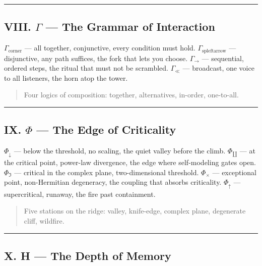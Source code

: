 \documentclass[12pt,a4paper]{article}
\begin{document}
\begin{center}
\rule{0.5\textwidth}{0.4pt}
\end{center}

\subsection{VIII. $\Gamma$ --- The Grammar of Interaction}

\emph{$\Gamma_{\text{corner}}$} --- all together, conjunctive, every condition must hold.
\emph{$\Gamma_{\text{spleftarrow}}$} --- disjunctive, any path suffices, the fork that lets you choose.
\emph{$\Gamma_{\to}$} --- sequential, ordered steps, the ritual that must not be scrambled.
\emph{$\Gamma_{\ll}$} --- broadcast, one voice to all listeners, the horn atop the tower.

\begin{quote}
Four logics of composition: together, alternatives, in-order, one-to-all.

\end{quote}

\begin{center}
\rule{0.5\textwidth}{0.4pt}
\end{center}

\subsection{IX. $\Phi$ --- The Edge of Criticality}

\emph{$\Phi_{\downarrow}$} --- below the threshold, no scaling, the quiet valley before the climb.
\emph{$\Phi_{\amalg}$} --- at the critical point, power-law divergence, the edge where self-modeling gates open.
\emph{$\Phi_{\Im}$} --- critical in the complex plane, two-dimensional threshold.
\emph{$\Phi_{\times}$} --- exceptional point, non-Hermitian degeneracy, the coupling that absorbs criticality.
\emph{$\Phi_{\uparrow}$} --- supercritical, runaway, the fire past containment.

\begin{quote}
Five stations on the ridge: valley, knife-edge, complex plane, degenerate cliff, wildfire.

\end{quote}

\begin{center}
\rule{0.5\textwidth}{0.4pt}
\end{center}

\subsection{X. H --- The Depth of Memory}
\end{document}
